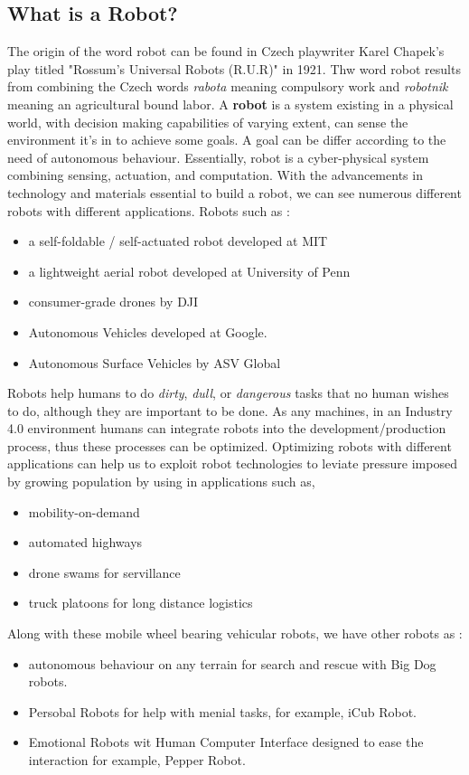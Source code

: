 \subsection{What is a Robot?}
The origin of the word robot can be found in Czech playwriter Karel Chapek's play titled "Rossum's
Universal Robots (R.U.R)" in 1921. Thw word robot results from combining the Czech words \textit{rabota} meaning 
compulsory work and \textit{robotnik} meaning an agricultural bound labor. A \textbf{robot} is a system existing 
in a physical world, with decision making capabilities of varying extent, can sense the environment it's in to achieve
some goals. A goal can be differ according to the need of autonomous behaviour. Essentially, robot is a cyber-physical system 
combining sensing, actuation, and computation. With the advancements in technology and materials essential to build a robot, we can
see numerous different robots with different applications. Robots such as : 
\begin{itemize}
    \item a self-foldable / self-actuated robot developed at MIT \cite{Sung2016ComputationalDO}
    \item a lightweight aerial robot developed at University of Penn
    \item consumer-grade drones by DJI 
    \item Autonomous Vehicles developed at Google.
    \item Autonomous Surface Vehicles by ASV Global
\end{itemize}
Robots help humans to do \textit{dirty}, \textit{dull}, or \textit{dangerous} tasks that no human wishes to do, although they are
important to be done. As any machines, in an Industry 4.0 environment humans can integrate robots into the development/production process,
thus these processes can be optimized. Optimizing robots with different applications can help us to exploit robot technologies to leviate pressure
imposed by growing population by using in applications such as, \begin{itemize}
    \item  mobility-on-demand
    \item  automated highways
    \item  drone swams for servillance
    \item  truck platoons for long distance logistics
\end{itemize} Along with these mobile wheel bearing vehicular robots, we have other robots as : 
\begin{itemize}
    \item autonomous behaviour on any terrain for search and rescue with Big Dog robots.
    \item Persobal Robots for help with menial tasks, for example, iCub Robot.
    \item Emotional Robots wit Human Computer Interface designed to ease the interaction for example, Pepper Robot.
\end{itemize}

